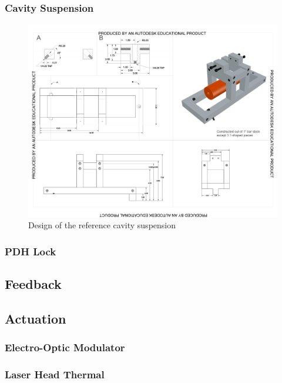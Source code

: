\subsubsection{Cavity Suspension}
\begin{figure}[htbp]
	\centering
		\includegraphics[width=15cm]{./figures/refcavsusdesign.pdf}
	\caption[Reference Cavity Suspension Design]{Design of the reference cavity suspension}
	\label{fig:refcav_sus}
\end{figure}

\subsubsection{PDH Lock}

\subsection{Feedback}

\subsection{Actuation}

\subsubsection{Electro-Optic Modulator}

\subsubsection{Laser Head Thermal}

